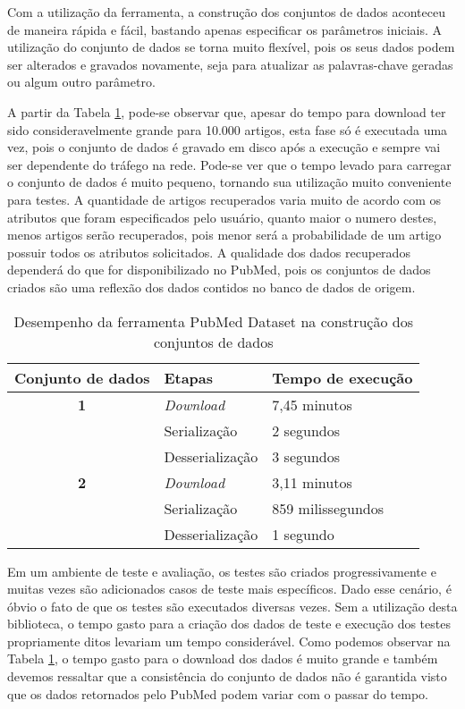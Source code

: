 Com a utilização da ferramenta, a construção dos conjuntos de dados aconteceu de maneira
rápida e fácil, bastando apenas especificar os parâmetros iniciais. A utilização do conjunto de
dados se torna muito flexível, pois os seus dados podem ser alterados e gravados novamente,
seja para atualizar as palavras-chave geradas ou algum outro parâmetro.

A partir da Tabela \ref{tab:tempoExecucao}, pode-se observar que, apesar do tempo para download ter sido
consideravelmente grande para 10.000 artigos, esta fase só é executada uma vez, pois o
conjunto de dados é gravado em disco após a execução e sempre vai ser dependente do tráfego
na rede. Pode-se ver que o tempo levado para carregar o conjunto de dados é muito pequeno,
tornando sua utilização muito conveniente para testes. A quantidade de artigos recuperados
varia muito de acordo com os atributos que foram especificados pelo usuário, quanto maior o
numero destes, menos artigos serão recuperados, pois menor será a probabilidade de um artigo
possuir todos os atributos solicitados. A qualidade dos dados recuperados dependerá do que for
disponibilizado no PubMed, pois os conjuntos de dados criados são uma reflexão dos dados
contidos no banco de dados de origem.

\begin{table}[htbp]
\center
\begin{tabular}{|l|l|l|}
\hline
\textbf{Conjunto de dados} & \textbf{Etapas} & \textbf{Tempo de execução} \\ \hline
\multicolumn{ 1}{|c|}{\textbf{1}} & \textit{Download} & 7,45 minutos \\ \cline{ 2- 3}
\multicolumn{ 1}{|l|}{} & Serialização & 2 segundos \\ \cline{ 2- 3}
\multicolumn{ 1}{|l|}{} & Desserialização & 3 segundos \\ \hline
\multicolumn{ 1}{|c|}{\textbf{2}} & \textit{Download} & 3,11 minutos \\ \cline{ 2- 3}
\multicolumn{ 1}{|l|}{} & Serialização & 859 milissegundos \\ \cline{ 2- 3}
\multicolumn{ 1}{|l|}{} & Desserialização & 1 segundo \\ \hline
\end{tabular}
\caption{Desempenho da ferramenta PubMed Dataset na construção dos conjuntos de dados}
\label{tab:tempoExecucao}
\end{table}

Em um ambiente de teste e avaliação, os testes são criados progressivamente e muitas vezes são adicionados casos de teste mais específicos. Dado esse cenário, é óbvio o fato de que os testes são executados diversas vezes. Sem a utilização desta biblioteca, o tempo gasto para a criação dos dados de teste e execução dos testes propriamente ditos levariam um tempo
considerável. Como podemos observar na Tabela \ref{tab:tempoExecucao}, o tempo gasto para o download dos dados é muito grande e também devemos ressaltar que a consistência do conjunto de dados não é garantida visto que os dados retornados pelo PubMed podem variar com o passar do tempo.

